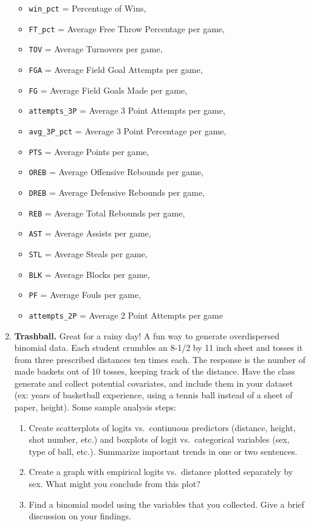 \documentclass[
]{krantz}
\providecommand{\tightlist}{%
  \setlength{\itemsep}{0pt}\setlength{\parskip}{0pt}}
\begin{document}
\begin{enumerate}
  \begin{itemize}
  \tightlist
  \item
    \texttt{win\_pct} = Percentage of Wins,
  \item
    \texttt{FT\_pct} = Average Free Throw Percentage per game,
  \item
    \texttt{TOV} = Average Turnovers per game,
  \item
    \texttt{FGA} = Average Field Goal Attempts per game,
  \item
    \texttt{FG} = Average Field Goals Made per game,
  \item
    \texttt{attempts\_3P} = Average 3 Point Attempts per game,
  \item
    \texttt{avg\_3P\_pct} = Average 3 Point Percentage per game,
  \item
    \texttt{PTS} = Average Points per game,
  \item
    \texttt{OREB} = Average Offensive Rebounds per game,
  \item
    \texttt{DREB} = Average Defensive Rebounds per game,
  \item
    \texttt{REB} = Average Total Rebounds per game,
  \item
    \texttt{AST} = Average Assists per game,
  \item
    \texttt{STL} = Average Steals per game,
  \item
    \texttt{BLK} = Average Blocks per game,
  \item
    \texttt{PF} = Average Fouls per game,
  \item
    \texttt{attempts\_2P} = Average 2 Point Attempts per game
  \end{itemize}
\item
  \textbf{Trashball.} Great for a rainy day! A fun way to generate overdispersed binomial data. Each student crumbles an 8-1/2 by 11 inch sheet and tosses it from three prescribed distances ten times each. The response is the number of made baskets out of 10 tosses, keeping track of the distance. Have the class generate and collect potential covariates, and include them in your dataset (ex: years of basketball experience, using a tennis ball instead of a sheet of paper, height). Some sample analysis steps:

  \begin{enumerate}
  \def\labelenumii{\alph{enumii}.}
  \tightlist
  \item
    Create scatterplots of logits vs.~continuous predictors (distance, height, shot number, etc.) and boxplots of logit vs.~categorical variables (sex, type of ball, etc.). Summarize important trends in one or two sentences.
  \item
    Create a graph with empirical logits vs.~distance plotted separately by sex. What might you conclude from this plot?
  \item
    Find a binomial model using the variables that you collected. Give a brief discussion on your findings.
  \end{enumerate}
\end{enumerate}
\end{document}
